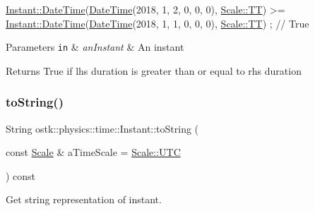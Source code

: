 \begin{DoxyCode}
\hyperlink{classostk_1_1physics_1_1time_1_1_instant_afd5725574a02389b80fad4baff313c8a}{Instant::DateTime}(\hyperlink{classostk_1_1physics_1_1time_1_1_instant_afd5725574a02389b80fad4baff313c8a}{DateTime}(2018, 1, 2, 0, 0, 0), 
      \hyperlink{namespaceostk_1_1physics_1_1time_adf23d37bd8641fb76a0e98ab46a70df7adf1f3edb9115acb0a1e04209b7a9937b}{Scale::TT}) >= \hyperlink{classostk_1_1physics_1_1time_1_1_instant_afd5725574a02389b80fad4baff313c8a}{Instant::DateTime}(\hyperlink{classostk_1_1physics_1_1time_1_1_instant_afd5725574a02389b80fad4baff313c8a}{DateTime}(2018, 1, 1, 0, 0, 0), 
      \hyperlink{namespaceostk_1_1physics_1_1time_adf23d37bd8641fb76a0e98ab46a70df7adf1f3edb9115acb0a1e04209b7a9937b}{Scale::TT}) ; \textcolor{comment}{// True}
\end{DoxyCode}



\begin{DoxyParams}[1]{Parameters}
\mbox{\tt in}  & {\em an\+Instant} & An instant \\
\hline
\end{DoxyParams}
\begin{DoxyReturn}{Returns}
True if lhs duration is greater than or equal to rhs duration 
\end{DoxyReturn}
\mbox{\label{classostk_1_1physics_1_1time_1_1_instant_a710ff6dec3b97f4e10bcfeae6335eb56}} 
\subsubsection{\texorpdfstring{to\+String()}{toString()}}
{\footnotesize\ttfamily String ostk\+::physics\+::time\+::\+Instant\+::to\+String (\begin{DoxyParamCaption}\item[{const \hyperlink{namespaceostk_1_1physics_1_1time_adf23d37bd8641fb76a0e98ab46a70df7}{Scale} \&}]{a\+Time\+Scale = {\ttfamily \hyperlink{namespaceostk_1_1physics_1_1time_adf23d37bd8641fb76a0e98ab46a70df7a9234324ddf6b4176b57d803a925b7961}{Scale\+::\+U\+TC}} }\end{DoxyParamCaption}) const}



Get string representation of instant. 


